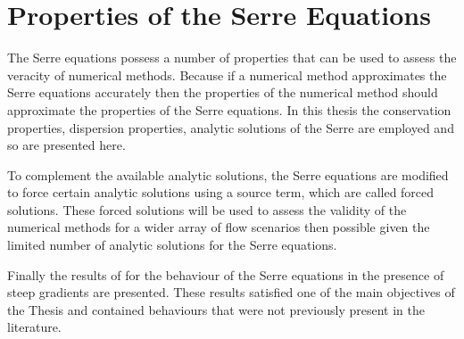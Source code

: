 \section{Properties of the Serre Equations}
The Serre equations possess a number of properties that can be used to assess the veracity of numerical methods. Because if a numerical method approximates the Serre equations accurately then the properties of the numerical method should approximate the properties of the Serre equations. In this thesis the conservation properties, dispersion properties, analytic solutions of the Serre are employed and so are presented here. 

To complement the available analytic solutions, the Serre equations are modified to force certain analytic solutions using a source term, which are called forced solutions. These forced solutions will be used to assess the validity of the numerical methods for a wider array of flow scenarios then possible given the limited number of analytic solutions for the Serre equations.

Finally the results of \citet{Pitt-2017-1725} for the behaviour of the Serre equations in the presence of steep gradients are presented. These results satisfied one of the main objectives of the Thesis and contained behaviours that were not previously present in the literature. 

